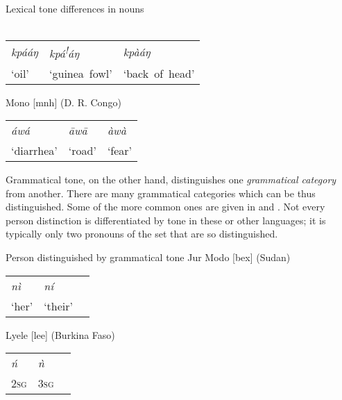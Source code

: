 \documentclass[output=paper]{langscibook}
\begin{document}
\ea Lexical tone differences in nouns\\
\label{ex:LexicalToneDifferencesNouns:1}
\ea
{}\smallskip\\
\begin{tabularx}{\linewidth}{@{}XXX@{}}
\textit{kpááŋ} & \textit{kpá\textsuperscript{!}}\textit{áŋ} &  \textit{kpàáŋ}\\
‘oil’          & ‘guinea~fowl’                              & ‘back~of~head’ \\
\end{tabularx}
\ex
Mono [mnh] (D. R. Congo) \citep[198]{Olson2005}\smallskip\\
\begin{tabularx}{\linewidth}{@{}XXX@{}}
\textit{áwá} & {\textit{\=aw\=a}} &  {\textit{àwà}}\\
‘diarrhea’   &  ‘road’            &  ‘fear’ \\
\end{tabularx}
\z\z
Grammatical tone, on the other hand, distinguishes one \textit{grammatical category} from another. There are many grammatical categories which can be thus distinguished. Some of the more common ones are given in  and . Not every person distinction is differentiated by tone in these or other languages; it is typically only two pronouns of the set that are so distinguished.

\ea Person distinguished by grammatical tone\label{tab:PersonByGrammaticalTone:2}
\ea Jur Modo  [bex]  (Sudan) \citep[80]{Persson2004}\smallskip\\
    \begin{tabularx}{\linewidth}{@{}XXX@{}}
    \textit{nì}   & \textit{ní} & \\
    ‘her’         & ‘their’     & \\
    \end{tabularx}
\ex Lyele [lee] (Burkina Faso) \citep[57]{Kutsch2014}\smallskip\\ 
    \begin{tabularx}{\linewidth}{@{}XXX@{}}
    \textit{ń}    & \textit{ǹ}   & \\
    \textsc{2sg}  & \textsc{3sg} & \\
    \end{tabularx}
\z
\z
\end{document}
